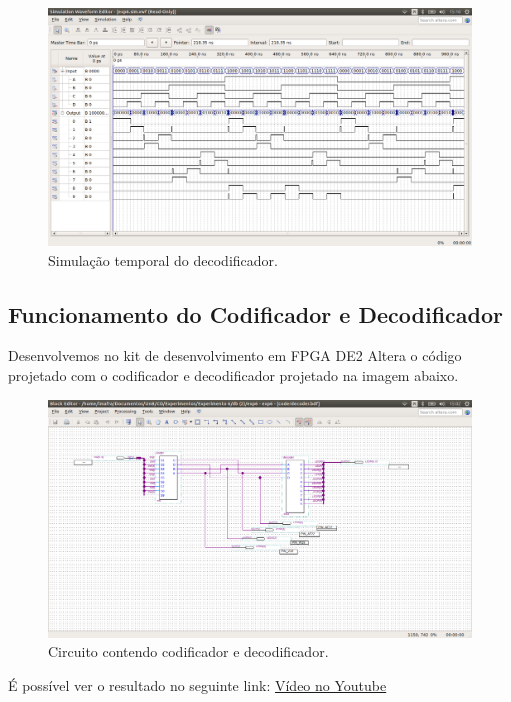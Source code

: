 \documentclass[12pt]{article}
\begin{document}
\begin{figure}[H]
	\centering
	\includegraphics[width=1\textwidth]{timingdecoder.png}
	\caption{Simulação temporal do decodificador.}
	\label{fig:timedecoder}
\end{figure}

\subsection{Funcionamento do Codificador e Decodificador}

Desenvolvemos no kit de desenvolvimento em FPGA DE2 Altera o código projetado com o codificador e decodificador projetado na imagem abaixo. 

\begin{figure}[H]
	\centering
	\includegraphics[width=1\textwidth]{coderdecoder.png}
	\caption{Circuito contendo codificador e decodificador.}
	\label{fig:coderdecoder}
\end{figure}

É possível ver o resultado no seguinte link: \href{https://www.youtube.com/watch?v=paRaiHqDqBo}{Vídeo no Youtube}
\end{document}
